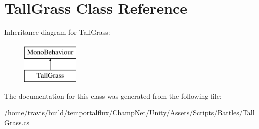 \hypertarget{class_tall_grass}{\section{Tall\-Grass Class Reference}
\label{class_tall_grass}
}
Inheritance diagram for Tall\-Grass\-:\begin{figure}[H]
\begin{center}
\leavevmode
\includegraphics[height=2.000000cm]{class_tall_grass}
\end{center}
\end{figure}


The documentation for this class was generated from the following file\-:\begin{DoxyCompactItemize}
\item 
/home/travis/build/temportalflux/\-Champ\-Net/\-Unity/\-Assets/\-Scripts/\-Battles/Tall\-Grass.\-cs\end{DoxyCompactItemize}
